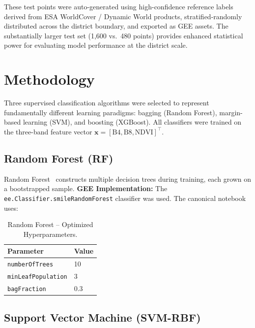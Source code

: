 \documentclass[12pt, a4paper, twocolumn]{article}
\begin{document}
These test points were auto-generated using high-confidence reference labels derived from ESA WorldCover / Dynamic World products, stratified-randomly distributed across the district boundary, and exported as GEE assets. The substantially larger test set (1,600 vs.\ 480 points) provides enhanced statistical power for evaluating model performance at the district scale.

\section{Methodology}
\label{sec:methodology}

Three supervised classification algorithms were selected to represent fundamentally different learning paradigms: bagging (Random Forest), margin-based learning (SVM), and boosting (XGBoost). All classifiers were trained on the three-band feature vector $\mathbf{x} = [\text{B4}, \text{B8}, \text{NDVI}]^\top$. 

\subsection{Random Forest (RF)}
\label{subsec:rf}

Random Forest~\cite{breiman2001random} constructs multiple decision trees during training, each grown on a bootstrapped sample. \textbf{GEE Implementation:} The \texttt{ee.Classifier.smileRandomForest} classifier was used. The canonical notebook uses:

\begin{table}[H]
\centering
\caption{Random Forest -- Optimized Hyperparameters.}
\label{tab:rf_params}
\begin{tabular}{@{}ll@{}}
\toprule
\textbf{Parameter} & \textbf{Value} \\
\midrule
\texttt{numberOfTrees} & 10 \\
\texttt{minLeafPopulation} & 3 \\
\texttt{bagFraction} & 0.3 \\
\bottomrule
\end{tabular}
\end{table}

\subsection{Support Vector Machine (SVM-RBF)}
\label{subsec:svm}
\end{document}
